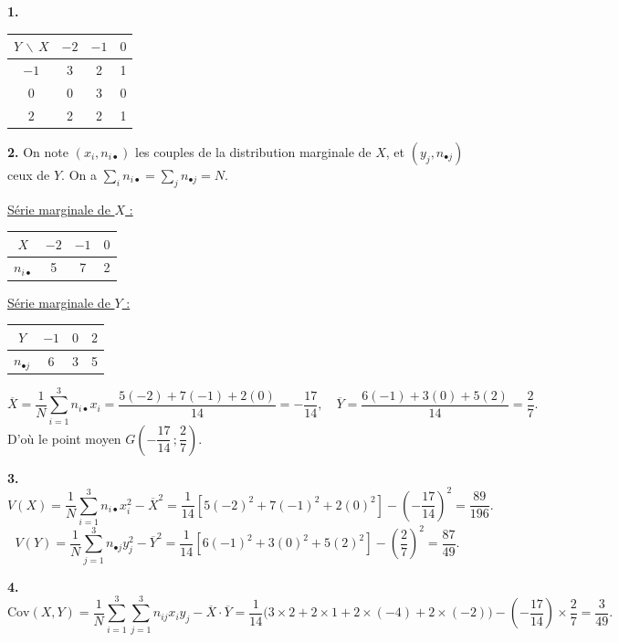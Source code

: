 \documentclass[11pt]{article}
\begin{document}

\textbf{1.}
\begin{center}
\renewcommand{\arraystretch}{1.3}
\begin{tabular}{|c|c|c|c|}
\hline
$Y\,\backslash\,X$ & $-2$ & $-1$ & $0$ \\
\hline
$-1$ & 3 & 2 & 1 \\
\hline
$0$ & 0 & 3 & 0 \\
\hline
$2$ & 2 & 2 & 1 \\
\hline
\end{tabular}
\end{center}

\textbf{2.} On note $(x_i, n_{i\bullet})$ les couples de la distribution marginale de $X$, et $(y_j, n_{\bullet j})$ ceux de $Y$. On a $\sum_i n_{i\bullet} = \sum_j n_{\bullet j} = N$.

\underline{Série marginale de $X$ :}
\begin{center}\renewcommand{\arraystretch}{1.3}
\begin{tabular}{|c|c|c|c|}\hline $X$ & $-2$ & $-1$ & $0$ \\\hline $n_{i\bullet}$ & 5 & 7 & 2 \\\hline\end{tabular}
\end{center}
\underline{Série marginale de $Y$ :}
\begin{center}\renewcommand{\arraystretch}{1.3}
\begin{tabular}{|c|c|c|c|}\hline $Y$ & $-1$ & $0$ & $2$ \\\hline $n_{\bullet j}$ & 6 & 3 & 5 \\\hline\end{tabular}
\end{center}
\[ \overline{X} = \frac{1}{N}\sum_{i=1}^3 n_{i\bullet}x_i = \frac{5(-2) + 7(-1) + 2(0)}{14} = -\frac{17}{14}, \quad \overline{Y} = \frac{6(-1) + 3(0) + 5(2)}{14} = \frac{2}{7}. \]
D'où le point moyen $G\left(-\dfrac{17}{14}\,;\dfrac{2}{7}\right)$.

\textbf{3.}
\[ V(X) = \frac{1}{N}\sum_{i=1}^3 n_{i\bullet}x_i^2 - \overline{X}^2 = \frac{1}{14}\left[5(-2)^2 + 7(-1)^2 + 2(0)^2\right] - \left(-\frac{17}{14}\right)^2 = \frac{89}{196}. \]
\[ V(Y) = \frac{1}{N}\sum_{j=1}^3 n_{\bullet j}y_j^2 - \overline{Y}^2 = \frac{1}{14}\left[6(-1)^2 + 3(0)^2 + 5(2)^2\right] - \left(\frac{2}{7}\right)^2 = \frac{87}{49}. \]

\textbf{4.}
\[ \mathrm{Cov}(X, Y) = \frac{1}{N}\sum_{i=1}^3\sum_{j=1}^3 n_{ij}x_i y_j - \overline{X}\cdot\overline{Y} = \frac{1}{14}\big(3 \times 2 + 2 \times 1 + 2 \times (-4) + 2 \times (-2)\big) - \left(-\frac{17}{14}\right) \times \frac{2}{7} = \frac{3}{49}. \]
\end{document}

